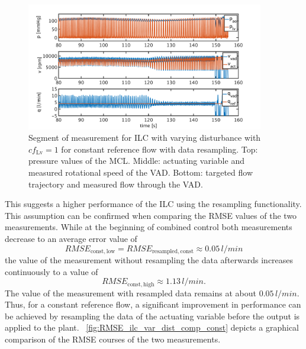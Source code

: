 \begin{figure}[ht!]
  \centering
  \includegraphics[width=0.925\textwidth]{images/chapt_5/ILC/ilc_var_dist_fix_const.pdf}
  \caption[Segment of measurement for ILC with varying disturbance with $cf_{\mathrm{Lv}}=1$ for constant reference flow with data resampling]{Segment of measurement for ILC with varying disturbance with $cf_{\mathrm{Lv}}=1$ for constant reference flow with data resampling. Top:  pressure values of the MCL. Middle: actuating variable and measured rotational speed of the VAD. Bottom: targeted flow trajectory and measured flow through the VAD.}
  \label{fig:ilc_var_dist_fix_const}
\end{figure}
\newpage
This suggests a higher performance of the ILC using the resampling functionality.
This assumption can be confirmed when comparing the RMSE values of the two measurements.
While at the beginning of combined control both measurements decrease to an average error value of
\begin{equation}
  RMSE_{\mathrm{const,low}}=RMSE_{\mathrm{resampled,const}}\approx0.05\,l/min
\end{equation}
 the value of the measurement without resampling the data afterwards increases continuously to a value of
\begin{equation}
  RMSE_{\mathrm{const,high}}\approx1.13\,l/min.
\end{equation}
The value of the measurement with resampled data remains at about $0.05\,l/min$. Thus, for a constant reference flow, a significant improvement in performance can be achieved by resampling the data of the actuating variable before the output is applied to the plant.
\figurename~\ref{fig:RMSE_ilc_var_dist_comp_const} depicts a graphical comparison of the RMSE courses of the two measurements.
